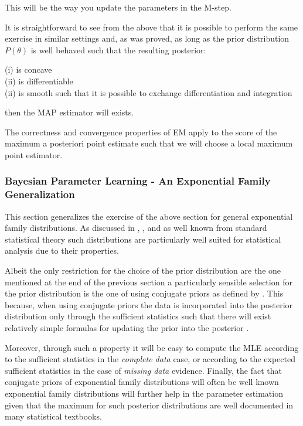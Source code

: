 \documentclass[11pt]{article}
\begin{document}
\begin{article}
This will be the way you update the parameters in the M-step.

It is straightforward to see from the above that it is possible to
perform the same exercise in similar settings and, as was proved,
as long as the prior distribution \(P(\theta)\) is well behaved such
that the resulting posterior:

(i) is concave \\
(ii) is differentiable \\
(ii) is smooth such that it is possible to exchange differentiation and integration

then the MAP estimator will exists.

The correctness and convergence properties of EM apply to the score
of the maximum a posteriori point estimate such that we will choose
a local maximum point estimator.

\subsubsection{Bayesian Parameter Learning - An Exponential Family Generalization}
\label{sec:org22affbd}

This section generalizes the exercise of the above section for
general exponential family distributions. As discussed in
\cite{barndorff1978hyperbolic}, \cite{geiger1998asymptotic},
\cite{lauritzen1996graphical} and as well known from standard
statistical theory such distributions are particularly well suited
for statistical analysis due to their properties. 

Albeit the only restriction for the choice of the prior
distribution are the one mentioned at the end of the previous
section a particularly sensible selection for the prior
distribution is the one of using conjugate priors as defined by
\cite{schlaifer1961applied}. This because, when using conjugate
priors the data is incorporated into the posterior distribution
only through the sufficient statistics such that there will exist
relatively simple formulas for updating the prior into the
posterior \cite{fink1997compendium}.

Moreover, through such a property it will be easy to compute the
MLE according to the sufficient statistics in the \emph{complete data}
case, or according to the expected sufficient statistics in the
case of \emph{missing data} evidence. Finally, the fact that conjugate
priors of exponential family distributions will often be well
known exponential family distributions will further help in the
parameter estimation given that the maximum for such posterior
distributions are well documented in many statistical textbooks.


\end{article}
\end{document}
